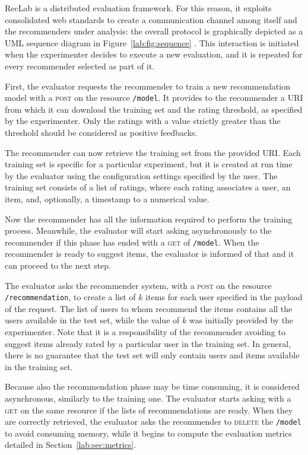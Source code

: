 RecLab is a distributed evaluation framework. For this reason, it exploits consolidated web standards to create a communication channel among itself and the recommenders under analysis: the overall protocol is graphically depicted as a UML sequence diagram in Figure~\ref{lab:fig:sequence} . This interaction is initiated when the experimenter decides to execute a new evaluation, and it is repeated for every recommender selected as part of it.

First, the evaluator requests the recommender to train a new recommendation model with a \textsc{post} on the resource \texttt{/model}. It provides to the recommender a URI from which it can download the training set and the rating threshold, as specified by the experimenter. Only the ratings with a value strictly greater than the threshold should be considered as positive feedbacks.

The recommender can now retrieve the training set from the provided URI. Each training set is specific for a particular experiment, but it is created at run time by the evaluator using the configuration settings specified by the user. The training set consists of a list of ratings, where each rating associates a user, an item, and, optionally, a timestamp to a numerical value.

Now the recommender has all the information required to perform the training process. Meanwhile, the evaluator will start asking asynchronously to the recommender if this phase has ended with a \textsc{get} of \texttt{/model}. When the recommender is ready to suggest items, the evaluator is informed of that and it can proceed to the next step.

The evaluator asks the recommender system, with a \textsc{post} on the resource \texttt{/recommendation}, to create a list of $k$ items for each user specified in the payload of the request. The list of users to whom recommend the items contains all the users available in the test set, while the value of $k$ was initially provided by the experimenter. Note that it is a responsibility of the recommender avoiding to suggest items already rated by a particular user in the training set. In general, there is no guarantee that the test set will only contain users and items available in the training set.

Because also the recommendation phase may be time consuming, it is considered asynchronous, similarly to the training one. The evaluator starts asking with a \textsc{get} on the same resource if the lists of recommendations are ready. When they are correctly retrieved, the evaluator asks the recommender to \textsc{delete} the \texttt{/model} to avoid consuming memory, while it begins to compute the evaluation metrics detailed in Section~\ref{lab:sec:metrics}.

